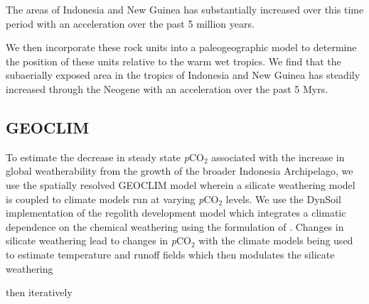 \documentclass[11pt,letterpaper]{article}
\newcommand{\pCOtwo}{\textit{p}CO$_{2}$\xspace}
\begin{document}
The areas of Indonesia and New Guinea has substantially increased over this time period with an acceleration over the past 5 million years. 

We then incorporate these rock units into a paleogeographic model to determine the position of these units relative to the warm wet tropics. We find that the subaerially exposed area in the tropics of Indonesia and New Guinea has steadily increased through the Neogene with an acceleration over the past 5 Myrs. 

\subsection*{GEOCLIM}

To estimate the decrease in steady state \pCOtwo associated with the increase in global weatherability from the growth of the broader Indonesia Archipelago, we use the spatially resolved GEOCLIM model \citep{Godderis2014a, Godderis2017c} wherein a silicate weathering model is coupled to climate models run at varying \pCOtwo levels. We use the DynSoil implementation of the \cite{Gabet2009a} regolith development model which integrates a climatic dependence on the chemical weathering using the formulation of \cite{West2012a}. Changes in silicate weathering lead to changes in \pCOtwo with the climate models being used to estimate temperature and runoff fields which then modulates the silicate weathering  

then iteratively 

\end{document}
